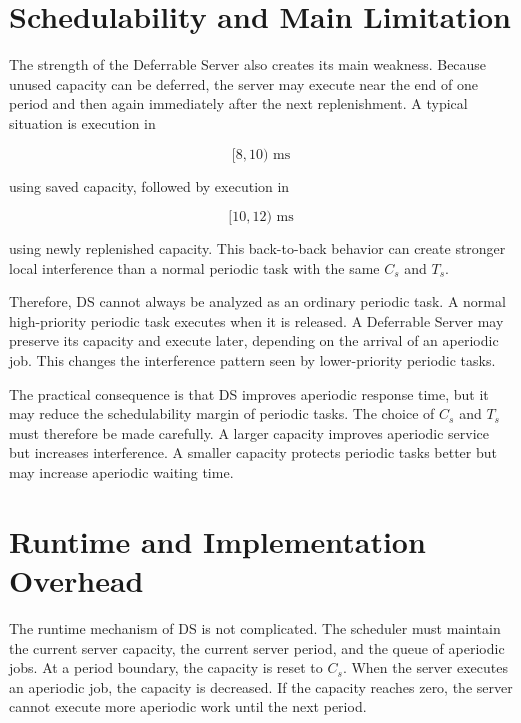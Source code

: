 \documentclass[conference]{IEEEtran}
\begin{document}
	\section{Schedulability and Main Limitation}
	
	The strength of the Deferrable Server also creates its main weakness. Because unused capacity can be deferred, the server may execute near the end of one period and then again immediately after the next replenishment. A typical situation is execution in
	
	\begin{equation}
		[8,10) \text{ ms}
	\end{equation}
	
	using saved capacity, followed by execution in
	
	\begin{equation}
		[10,12) \text{ ms}
	\end{equation}
	
	using newly replenished capacity. This back-to-back behavior can create stronger local interference than a normal periodic task with the same $C_s$ and $T_s$.
	
	Therefore, DS cannot always be analyzed as an ordinary periodic task. A normal high-priority periodic task executes when it is released. A Deferrable Server may preserve its capacity and execute later, depending on the arrival of an aperiodic job. This changes the interference pattern seen by lower-priority periodic tasks.
	
	The practical consequence is that DS improves aperiodic response time, but it may reduce the schedulability margin of periodic tasks. The choice of $C_s$ and $T_s$ must therefore be made carefully. A larger capacity improves aperiodic service but increases interference. A smaller capacity protects periodic tasks better but may increase aperiodic waiting time.
	
	\section{Runtime and Implementation Overhead}
	
	The runtime mechanism of DS is not complicated. The scheduler must maintain the current server capacity, the current server period, and the queue of aperiodic jobs. At a period boundary, the capacity is reset to $C_s$. When the server executes an aperiodic job, the capacity is decreased. If the capacity reaches zero, the server cannot execute more aperiodic work until the next period.
	
\end{document}
